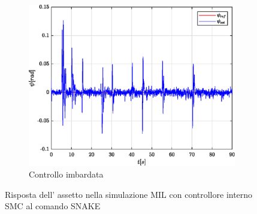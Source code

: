 \begin{figure}
\begin{subfigure}{0.45\textwidth}
		\centering
		\includegraphics[width=1\textwidth]{Simulazioni/Figure/SMC/SNAKE_MIL/AttitudeControlYaw}
		\caption{Controllo imbardata}
	\end{subfigure}
	\caption{Risposta dell' assetto nella simulazione MIL con controllore interno SMC al comando SNAKE}
\end{figure}


